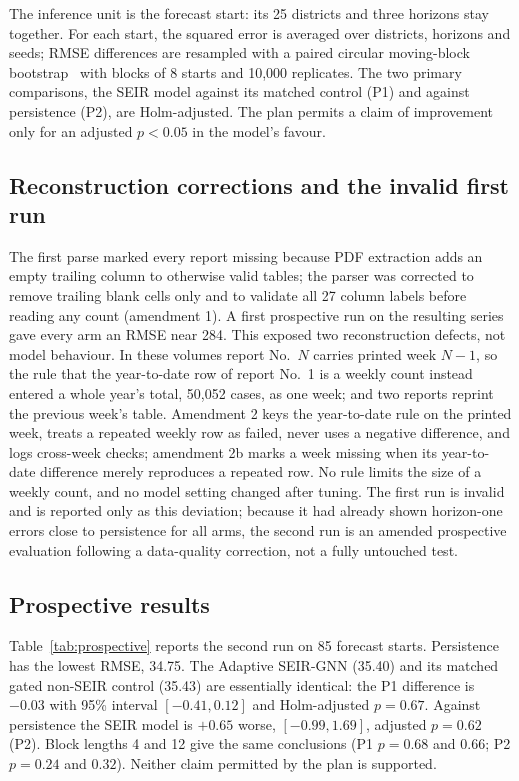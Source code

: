 \documentclass[conference]{IEEEtran}
\begin{document}
The inference unit is the forecast start: its 25 districts and three horizons stay together.
For each start, the squared error is averaged over districts, horizons and seeds; RMSE differences are resampled with a paired circular moving-block bootstrap~\cite{kunsch1989bootstrap,politis1992circular} with blocks of 8 starts and 10{,}000 replicates.
The two primary comparisons, the SEIR model against its matched control (P1) and against persistence (P2), are Holm-adjusted.
The plan permits a claim of improvement only for an adjusted $p<0.05$ in the model's favour.

\subsection{Reconstruction corrections and the invalid first run}\label{sec:deviations}
The first parse marked every report missing because PDF extraction adds an empty trailing column to otherwise valid tables; the parser was corrected to remove trailing blank cells only and to validate all 27 column labels before reading any count (amendment 1). %
A first prospective run on the resulting series gave every arm an RMSE near 284. %
This exposed two reconstruction defects, not model behaviour.
In these volumes report No.~$N$ carries printed week $N-1$, so the rule that the year-to-date row of report No.~1 is a weekly count instead entered a whole year's total, 50{,}052 cases, as one week; and two reports reprint the previous week's table.
Amendment 2 keys the year-to-date rule on the printed week, treats a repeated weekly row as failed, never uses a negative difference, and logs cross-week checks; amendment 2b marks a week missing when its year-to-date difference merely reproduces a repeated row. %
No rule limits the size of a weekly count, and no model setting changed after tuning.
The first run is invalid and is reported only as this deviation; because it had already shown horizon-one errors close to persistence for all arms, the second run is an amended prospective evaluation following a data-quality correction, not a fully untouched test.



\subsection{Prospective results}
Table~\ref{tab:prospective} reports the second run on 85 forecast starts. %
Persistence has the lowest RMSE, 34.75.
The Adaptive SEIR-GNN (35.40) and its matched gated non-SEIR control (35.43) are essentially identical: the P1 difference is $-0.03$ with 95\% interval $[-0.41, 0.12]$ and Holm-adjusted $p=0.67$. %
Against persistence the SEIR model is $+0.65$ worse, $[-0.99, 1.69]$, adjusted $p=0.62$ (P2). %
Block lengths 4 and 12 give the same conclusions (P1 $p=0.68$ and $0.66$; P2 $p=0.24$ and $0.32$). %
Neither claim permitted by the plan is supported.
\end{document}
